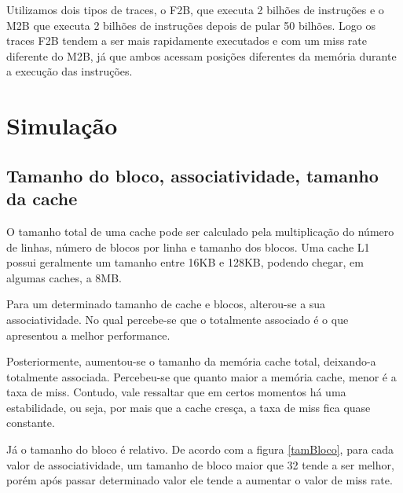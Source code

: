 \documentclass[12pt,a4paper]{article}
\begin{document}
Utilizamos dois tipos de traces, o F2B, que executa 2 bilhões de
instruções e o M2B que executa 2 bilhões de instruções depois de pular
50 bilhões. Logo os traces F2B tendem a ser mais rapidamente
executados e com um miss rate diferente do M2B, já que ambos
acessam posições diferentes da memória durante a execução das instruções. 


\section{Simulação}

\subsection{Tamanho do bloco, associatividade, tamanho da cache}
\label{sec1}
O tamanho total de uma cache pode ser calculado pela multiplicação do
número de linhas, número de blocos por linha e tamanho dos blocos.
Uma cache L1 possui geralmente um tamanho entre 16KB e 128KB, podendo chegar, em algumas caches, a 8MB.

Para um determinado tamanho de cache e blocos, alterou-se a sua
associatividade. No qual percebe-se que o totalmente associado é o que
apresentou a melhor performance.

Posteriormente, aumentou-se o tamanho da memória cache total, deixando-a totalmente associada.
Percebeu-se que quanto maior a memória cache, menor é a taxa de miss. Contudo, vale ressaltar que
em certos momentos há uma estabilidade, ou seja, por mais que a cache cresça, a taxa de miss fica quase
constante.

Já o tamanho do bloco é relativo. De acordo com a figura \ref{tamBloco}, para cada valor de associatividade, um tamanho de bloco maior que 32
tende a ser melhor, porém após passar determinado valor ele tende a aumentar o valor de miss rate.
\end{document}
